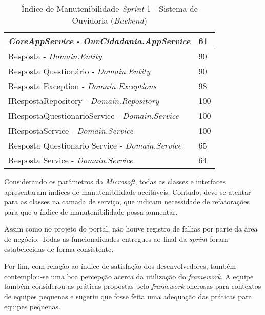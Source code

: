 \begin{table}[h]
\centering
\begin{tabular}{ | m{12cm} | m{4cm} | } 
\hline
\textit{CoreAppService} - \textit{OuvCidadania.AppService} & 61 \\ 
\hline
Resposta - \textit{Domain.Entity} & 90 \\ 
\hline
Resposta Questionário - \textit{Domain.Entity} & 90 \\ 
\hline
Resposta Exception - \textit{Domain.Exceptions} & 98 \\ 
\hline
IRespostaRepository - \textit{Domain.Repository} & 100 \\
\hline
IRespostaQuestionarioService - \textit{Domain.Service} & 100 \\
\hline
IRespostaService - \textit{Domain.Service} & 100 \\
\hline
Resposta Questionario Service - \textit{Domain.Service} & 65 \\
\hline
Resposta Service - \textit{Domain.Service} & 64 \\
\hline
\end{tabular}
\caption{Índice de Manutenibilidade \textit{Sprint} 1 - Sistema de Ouvidoria (\textit{Backend})}
\label{table:tabela6}
\end{table}

Considerando os parâmetros da \textit{Microsoft}, todas as classes e interfaces apresentaram índices de manutenibilidade aceitáveis. Contudo, deve-se atentar para as classes na camada de serviço, que indicam necessidade de refatorações para que o índice de manutenibilidade possa aumentar.

Assim como no projeto do portal, não houve registro de falhas por parte da área de negócio. Todas as funcionalidades entregues ao final da \textit{sprint} foram estabelecidas de forma consistente.

Por fim, com relação ao índice de satisfação dos desenvolvedores, também contemplou-se uma boa percepção acerca da utilização do \textit{framework}. A equipe também considerou as práticas propostas pelo \textit{framework} onerosas para contextos de equipes pequenas e sugeriu que fosse feita uma adequação das práticas para equipes pequenas.